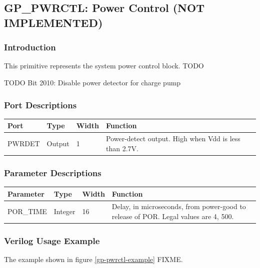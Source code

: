 \documentclass[11pt]{article}
\begin{document}

\pagebreak
\clearpage
\subsection{GP\_PWRCTL: Power Control (NOT IMPLEMENTED)}

\subsubsection{Introduction}
This primitive represents the system power control block. TODO


TODO
Bit 2010: Disable power detector for charge pump

\subsubsection{Port Descriptions}

\begin{tabularx}{5in}{|l|l|l|X|}
\hline
{\bfseries Port} & {\bfseries Type} & {\bfseries Width} & {\bfseries Function} \\
\hline
PWRDET & Output & 1 & Power-detect output. High when Vdd is less than 2.7V.\\
\hline
\end{tabularx}

\subsubsection{Parameter Descriptions}

\begin{tabularx}{5in}{|l|l|l|X|}
\hline
{\bfseries Parameter} & {\bfseries Type} & {\bfseries Width} & {\bfseries Function} \\
\hline
POR\_TIME & Integer & 16 & Delay, in microseconds, from power-good to release of POR. Legal values are 4, 500.\\
\hline
\end{tabularx}

\subsubsection{Verilog Usage Example}

The example shown in figure \ref{gp-pwrctl-example} FIXME.
\end{document}
